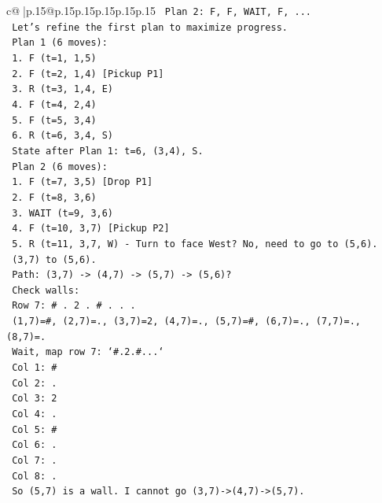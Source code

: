 \documentclass{article}
\begin{document}
{\begin{supertabular}{c@{$\;$}|p{.15\linewidth}@{}p{.15\linewidth}p{.15\linewidth}p{.15\linewidth}p{.15\linewidth}p{.15\linewidth}}
{{{\texttt{       Plan 2: F, F, WAIT, F, ...} \\
\texttt{       Let's refine the first plan to maximize progress.} \\
\texttt{       Plan 1 (6 moves):} \\
\texttt{       1. F (t=1, 1,5)} \\
\texttt{       2. F (t=2, 1,4) {[}Pickup P1{]}} \\
\texttt{       3. R (t=3, 1,4, E)} \\
\texttt{       4. F (t=4, 2,4)} \\
\texttt{       5. F (t=5, 3,4)} \\
\texttt{       6. R (t=6, 3,4, S)} \\
\texttt{       State after Plan 1: t=6, (3,4), S.} \\
\texttt{       Plan 2 (6 moves):} \\
\texttt{       1. F (t=7, 3,5) {[}Drop P1{]}} \\
\texttt{       2. F (t=8, 3,6)} \\
\texttt{       3. WAIT (t=9, 3,6)} \\
\texttt{       4. F (t=10, 3,7) {[}Pickup P2{]}} \\
\texttt{       5. R (t=11, 3,7, W) {-} Turn to face West? No, need to go to (5,6).} \\
\texttt{          (3,7) to (5,6).} \\
\texttt{          Path: (3,7) {-}> (4,7) {-}> (5,7) {-}> (5,6)?} \\
\texttt{          Check walls:} \\
\texttt{          Row 7: \# . 2 . \# . . .} \\
\texttt{          (1,7)=\#, (2,7)=., (3,7)=2, (4,7)=., (5,7)=\#, (6,7)=., (7,7)=., (8,7)=.} \\
\texttt{          Wait, map row 7: `\#.2.\#...`} \\
\texttt{          Col 1: \#} \\
\texttt{          Col 2: .} \\
\texttt{          Col 3: 2} \\
\texttt{          Col 4: .} \\
\texttt{          Col 5: \#} \\
\texttt{          Col 6: .} \\
\texttt{          Col 7: .} \\
\texttt{          Col 8: .} \\
\texttt{          So (5,7) is a wall. I cannot go (3,7){-}>(4,7){-}>(5,7).} \\
}}}
\end{supertabular}}
\end{document}
